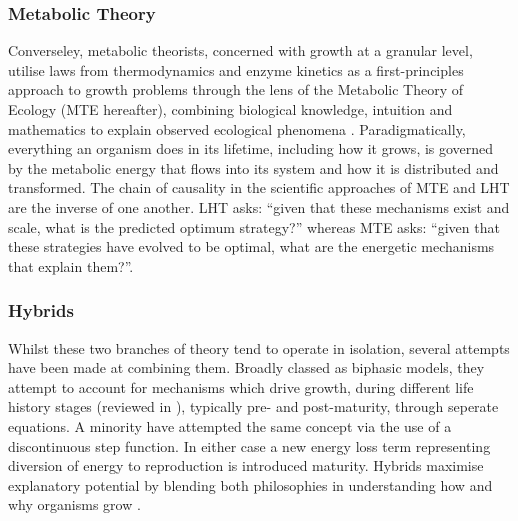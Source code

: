 \documentclass[a4paper]{article} %
\begin{document}
        \subsubsection{Metabolic Theory}
        Converseley, metabolic theorists, concerned with growth at a granular level, utilise laws from thermodynamics and enzyme kinetics as a first-principles approach to growth problems through the lens of the Metabolic Theory of Ecology (MTE hereafter), combining biological knowledge, intuition and mathematics to explain observed ecological phenomena \autocite{Brown2004}. Paradigmatically, everything an organism does in its lifetime, including how it grows, is governed by the metabolic energy that flows into its system and how it is distributed and transformed. The chain of causality in the scientific approaches of MTE and LHT are the inverse of one another. LHT asks: ``given that these mechanisms exist and scale, what is the predicted optimum strategy?'' whereas MTE asks: ``given that these strategies have evolved to be optimal, what are the energetic mechanisms that explain them?''.
        
        \subsubsection{Hybrids}\label{hybrids}
        Whilst these two branches of theory tend to operate in isolation, several attempts have been made at combining them. Broadly classed as biphasic models, they attempt to account for mechanisms which drive growth, during different life history stages (reviewed in \autocite{Wilson2018}), typically pre- and post-maturity, through seperate equations. A minority have attempted the same concept via the use of a discontinuous step function. In either case a new energy loss term representing diversion of energy to reproduction is introduced maturity. Hybrids maximise explanatory potential by blending both philosophies in understanding how and why organisms grow \autocite{Marshall2019b}.
\end{document}
